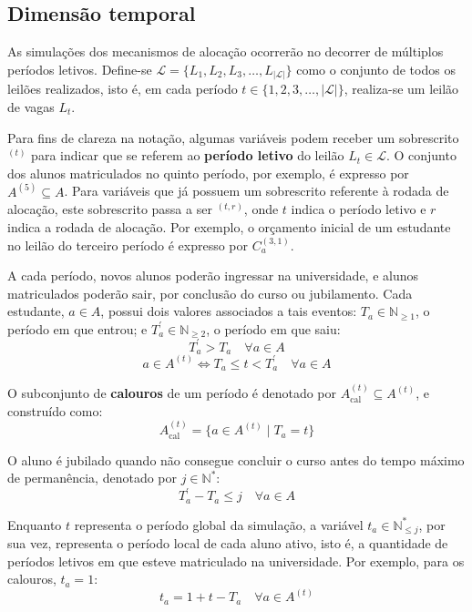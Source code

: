 \documentclass[
    12pt,
    openany,
    oneside,
    a4paper,
    english,
    brazil
]{abntex2}
\begin{document}
\subsection{Dimensão temporal}

As simulações dos mecanismos de alocação ocorrerão no decorrer de múltiplos períodos letivos. Define-se $\mathcal{L} = \{L_1, L_2, L_3, \dots, L_{|\mathcal{L}|}\}$ como o conjunto de todos os leilões realizados, isto é, em cada período $t \in \{1, 2, 3, \dots, |\mathcal{L}|\}$, realiza-se um leilão de vagas $L_t$.

Para fins de clareza na notação, algumas variáveis podem receber um sobrescrito $^{(t)}$ para indicar que se referem ao \textbf{período letivo} do leilão $L_t \in \mathcal{L}$. O conjunto dos alunos matriculados no quinto período, por exemplo, é expresso por $A^{(5)} \subseteq A$. Para variáveis que já possuem um sobrescrito referente à rodada de alocação, este sobrescrito passa a ser $^{(t, r)}$, onde $t$ indica o período letivo e $r$ indica a rodada de alocação. Por exemplo, o orçamento inicial de um estudante no leilão do terceiro período é expresso por $C_a^{(3, 1)}$.

A cada período, novos alunos poderão ingressar na universidade, e alunos matriculados poderão sair, por conclusão do curso ou jubilamento. Cada estudante, $a \in A$, possui dois valores associados a tais eventos: $T_a \in \mathbb{N}_{\geq 1}$, o período em que entrou; e $T^{\prime}_a  \in \mathbb{N}_{\geq 2}$, o período em que saiu:
\begin{equation}
    T^{\prime}_a > T_a \quad \forall a \in A
\end{equation}
\begin{equation}
    a \in A^{(t)} \iff T_a \leq t < T^{\prime}_a \quad \forall a \in A 
\end{equation}

O subconjunto de \textbf{calouros} de um período é denotado por $A^{(t)}_\text{cal} \subseteq A^{(t)}$, e construído como:
\begin{equation}
    A^{(t)}_\text{cal} = \{a \in A^{(t)} \mid T_a = t\}
\end{equation}

O aluno é jubilado quando não consegue concluir o curso antes do tempo máximo de permanência, denotado por $j \in \mathbb{N}^*$:
\begin{equation}
    T^{\prime}_a - T_a \leq j \quad \forall a \in A
\end{equation}

Enquanto $t$ representa o período global da simulação, a variável $t_a \in \mathbb{N}^{*}_{\leq j}$, por sua vez, representa o período local de cada aluno ativo, isto é, a quantidade de períodos letivos em que esteve matriculado na universidade. Por exemplo, para os calouros, $t_a = 1$:
\begin{equation}
    t_a = 1 + t - T_a \quad \forall a \in A^{(t)}
\end{equation}
\end{document}

